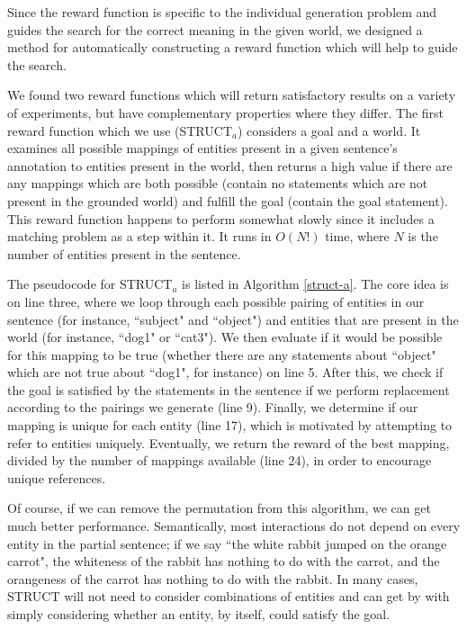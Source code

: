 Since the reward function is specific to the individual generation
problem and guides the search for the correct meaning in the
given world, we designed a method for automatically constructing
a reward function which will help to guide the search.
 
We found two reward functions which will
 return satisfactory results on a variety of experiments, but have complementary
properties where they differ.  The first reward function
 which we use (STRUCT$_a$) considers a goal and a
 world.  It examines all possible mappings of entities present in
 a given sentence's annotation to entities present in the world, then returns
 a high value if there are any mappings which are both possible (contain no statements
 which are not present in the grounded world) and fulfill the goal (contain the
 goal statement).  This reward function happens to perform somewhat slowly since it includes
a matching problem as a step within it.  It runs in $O(N!)$ time, where
$N$ is the number of entities present in the sentence.  

The pseudocode for STRUCT$_a$ is listed in Algorithm \ref{struct-a}.  The core idea is on line three, where
we loop through each possible pairing of entities in our sentence (for instance,
``subject" and ``object") and entities that are present in the world (for instance,
``dog1" or ``cat3").  We then evaluate if it would be possible for this mapping to be
true (whether there are any statements about ``object" which are not true about
``dog1", for instance) on line 5.  After this, we check if the goal is satisfied by
the statements in the sentence if we perform replacement according to the pairings
we generate (line 9).  Finally, we determine if our mapping is unique for each entity
(line 17), which is motivated by attempting to refer to entities uniquely.  Eventually,
we return the reward of the best mapping, divided by the number of mappings
available (line 24), in order to encourage unique references.

Of course, if we can remove the permutation from this algorithm,
we can get much better performance.  Semantically, most interactions do not
depend on every entity in the partial sentence; if we say ``the white rabbit
jumped on the orange carrot", the whiteness of the rabbit has nothing to do
with the carrot, and the orangeness of the carrot has nothing to do with the rabbit.  
In many cases,
STRUCT will not need to consider combinations of entities and
can get by with simply considering whether an entity, by itself, could
satisfy the goal.

